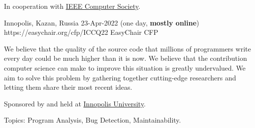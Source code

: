 \documentclass{../cfp}
\begin{document}
\PrintLogo{}



In cooperation
with
\href{https://conferences.ieee.org/conferences_events/conferences/conferencedetails/53703}{IEEE Computer Society}.

\vspace{6pt}

\PrintAddress
  {Innopolis, Kazan, Russia}
  {23-Apr-2022 (one day, \textbf{mostly online})}
  {https://easychair.org/cfp/ICCQ22}
  {EasyChair CFP}

\vspace{12pt}
%
%
%
\vspace{12pt}

We believe that the quality of the source code that millions of programmers
write every day could be much higher than it is now. We believe that the
contribution computer science can make to improve this situation is greatly
undervalued. We aim to solve this problem by gathering
together cutting-edge researchers and letting them share their most recent ideas.

Sponsored by and held at \href{https://innopolis.university/en/}{Innopolis University}.

Topics: Program Analysis, Bug Detection, Maintainability.
\end{document}
